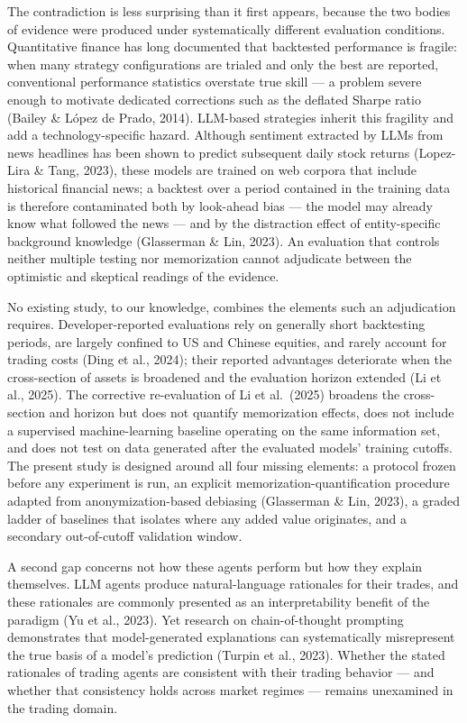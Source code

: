 \documentclass[
  12pt,
]{article}
\begin{document}
The contradiction is less surprising than it first appears, because the
two bodies of evidence were produced under systematically different
evaluation conditions. Quantitative finance has long documented that
backtested performance is fragile: when many strategy configurations are
trialed and only the best are reported, conventional performance
statistics overstate true skill --- a problem severe enough to motivate
dedicated corrections such as the deflated Sharpe ratio (Bailey \& López
de Prado, 2014). LLM-based strategies inherit this fragility and add a
technology-specific hazard. Although sentiment extracted by LLMs from
news headlines has been shown to predict subsequent daily stock returns
(Lopez-Lira \& Tang, 2023), these models are trained on web corpora that
include historical financial news; a backtest over a period contained in
the training data is therefore contaminated both by look-ahead bias ---
the model may already know what followed the news --- and by the
distraction effect of entity-specific background knowledge (Glasserman
\& Lin, 2023). An evaluation that controls neither multiple testing nor
memorization cannot adjudicate between the optimistic and skeptical
readings of the evidence.

No existing study, to our knowledge, combines the elements such an
adjudication requires. Developer-reported evaluations rely on generally
short backtesting periods, are largely confined to US and Chinese
equities, and rarely account for trading costs (Ding et al., 2024);
their reported advantages deteriorate when the cross-section of assets
is broadened and the evaluation horizon extended (Li et al., 2025). The
corrective re-evaluation of Li et al.~(2025) broadens the cross-section
and horizon but does not quantify memorization effects, does not include
a supervised machine-learning baseline operating on the same information
set, and does not test on data generated after the evaluated models'
training cutoffs. The present study is designed around all four missing
elements: a protocol frozen before any experiment is run, an explicit
memorization-quantification procedure adapted from anonymization-based
debiasing (Glasserman \& Lin, 2023), a graded ladder of baselines that
isolates where any added value originates, and a secondary out-of-cutoff
validation window.

A second gap concerns not how these agents perform but how they explain
themselves. LLM agents produce natural-language rationales for their
trades, and these rationales are commonly presented as an
interpretability benefit of the paradigm (Yu et al., 2023). Yet research
on chain-of-thought prompting demonstrates that model-generated
explanations can systematically misrepresent the true basis of a model's
prediction (Turpin et al., 2023). Whether the stated rationales of
trading agents are consistent with their trading behavior --- and
whether that consistency holds across market regimes --- remains
unexamined in the trading domain.
\end{document}
